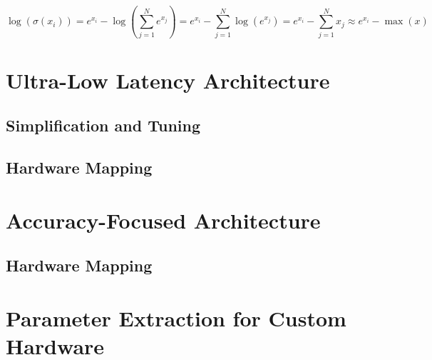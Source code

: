 \begin{equation} \label{eq:log-softmax-max}
    \log (\sigma (x_i)) = e^{x_i} - \log(\sum_{j=1}^{N} e^{x_j}) = e^{x_i} - \sum_{j=1}^{N} \log(e^{x_j}) = e^{x_i} - \sum_{j=1}^{N} x_j \approx e^{x_i} - \max(x)
\end{equation}


\section{Ultra-Low Latency Architecture}

\subsection{Simplification and Tuning}

\subsection{Hardware Mapping}


\section{Accuracy-Focused Architecture}

\subsection{Hardware Mapping}


\section{Parameter Extraction for Custom Hardware}


